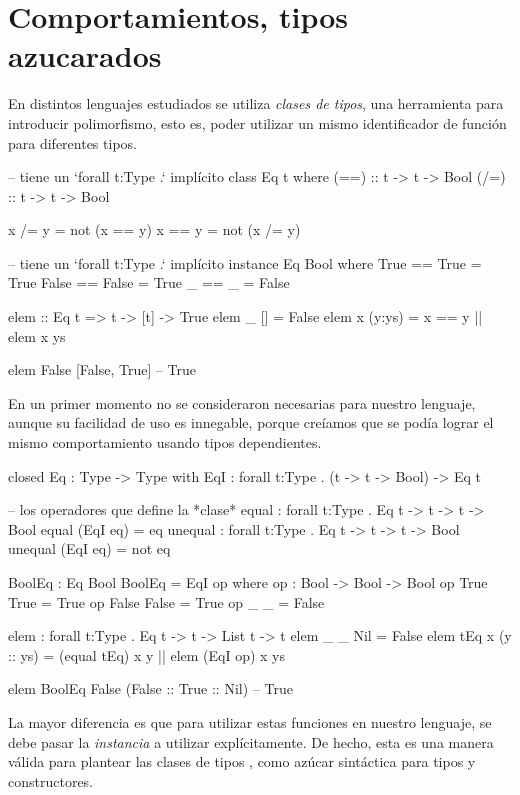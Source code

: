 {\section{Comportamientos, tipos azucarados}

\begin{designfr}
En distintos lenguajes estudiados se utiliza \emph{clases de tipos}, una herramienta para introducir polimorfismo, esto es, poder utilizar un mismo identificador de función para diferentes tipos.

\begin{haskellcode}
-- tiene un `forall t:Type .` implícito
class Eq t where
    (==) :: t -> t -> Bool
    (/=) :: t -> t -> Bool

    x /= y = not (x == y)
    x == y = not (x /= y)

-- tiene un `forall t:Type .` implícito
instance Eq Bool where
    True == True = True
    False == False = True
    _ == _ = False

elem :: Eq t => t -> [t] -> True
elem _ [] = False
elem x (y:ys) = x == y || elem x ys

elem False [False, True]    -- True
\end{haskellcode}

En un primer momento no se consideraron necesarias para nuestro lenguaje, aunque su facilidad de uso es innegable, porque creíamos que se podía lograr el mismo comportamiento usando tipos dependientes.

\begin{anglercode}
closed Eq : Type -> Type with
    EqI : forall t:Type . (t -> t -> Bool) -> Eq t

-- los operadores que define la *clase*
equal : forall t:Type . Eq t -> t -> t -> Bool
equal (EqI eq) = eq
unequal : forall t:Type . Eq t -> t -> t -> Bool
unequal (EqI eq) = not eq

BoolEq : Eq Bool
BoolEq = EqI op
    where
        op : Bool -> Bool -> Bool
        op True  True  = True
        op False False = True
        op _     _     = False

elem : forall t:Type . Eq t -> t -> List t -> t
elem _         _ Nil = False
elem tEq x (y :: ys) = (equal tEq) x y || elem (EqI op) x ys

elem BoolEq False (False :: True :: Nil)    -- True
\end{anglercode}

La mayor diferencia es que para utilizar estas funciones en nuestro lenguaje, se debe pasar la \emph{instancia} a utilizar explícitamente. De hecho, esta es una manera válida para plantear las clases de tipos \cite{scrap-type-classes}, como azúcar sintáctica para tipos y constructores.
\end{designfr}

}
